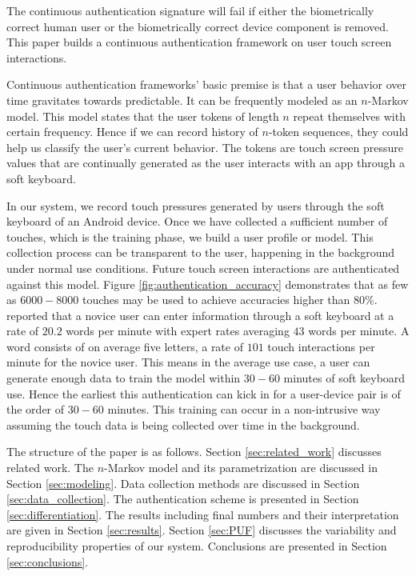 \documentclass{acm_proc_article-sp}
\begin{document}
The continuous authentication signature will fail if either the biometrically correct human user
or the biometrically correct device component is removed.
This paper builds a continuous authentication framework on user touch screen interactions.

Continuous authentication frameworks' basic premise is that a user behavior over time gravitates
towards  predictable. 
It can be frequently modeled as an $n$-Markov model. 
This model states that the user tokens of length $n$ repeat themselves with certain frequency. Hence if we can record history
of $n$-token sequences, they could help us classify the user's current behavior.
The tokens are touch screen pressure values that are continually generated
as the user interacts with an app through a soft keyboard.

In our system, we record touch pressures generated by 
users through the soft keyboard of an Android device. 
Once we have collected a sufficient number of touches, which is the training phase, we build 
a user profile or model.
%
This collection process can be transparent to the user,
happening in the background under normal use conditions. 
Future touch screen interactions are authenticated against this model.
%
Figure \ref{fig:authentication_accuracy} demonstrates that 
as few as $6000-8000$ touches may be used to achieve accuracies higher than $80$\%.
%
\cite{mackenzie1999text} reported that a
novice user can enter information through 
a soft keyboard at a rate of $20.2$ words per minute with
expert rates averaging $43$ words per minute.
%
A word consists of on average five letters, 
a rate of $101$ touch interactions per minute for the novice user.
%
This means in the average use case, a user can generate enough data to train
the model within $30-60$ minutes of soft keyboard use.
%
Hence the earliest this authentication can kick in
for a user-device pair is of the order of $30-60$ minutes.
%
This training can occur in a non-intrusive way
assuming the touch data is being collected over time in the background.

The structure of the paper is as follows. Section \ref{sec:related_work} discusses related work. The $n$-Markov model and its parametrization are discussed in Section \ref{sec:modeling}. 
Data collection methods are discussed in Section \ref{sec:data_collection}. The authentication scheme is presented in Section \ref{sec:differentiation}. The results including final numbers and 
their interpretation are given in Section \ref{sec:results}.
Section \ref{sec:PUF} discusses the variability and reproducibility properties of our system.
Conclusions are presented in Section \ref{sec:conclusions}. 
\end{document}
